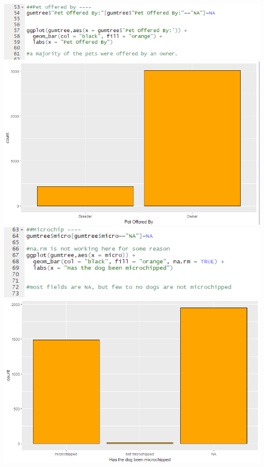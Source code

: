 \documentclass[a4paper]{article}
\begin{document}
{\includegraphics[scale=.75]{gumtree_SellerCode}\\
\includegraphics[scale=.75]{gumtree_SellerGraph.PNG}\\
\includegraphics[scale=.75]{gumtree_MicroCode.PNG}\\
\includegraphics[scale=.75]{gumtree_MicroGraph.PNG}\\
}
\end{document}
